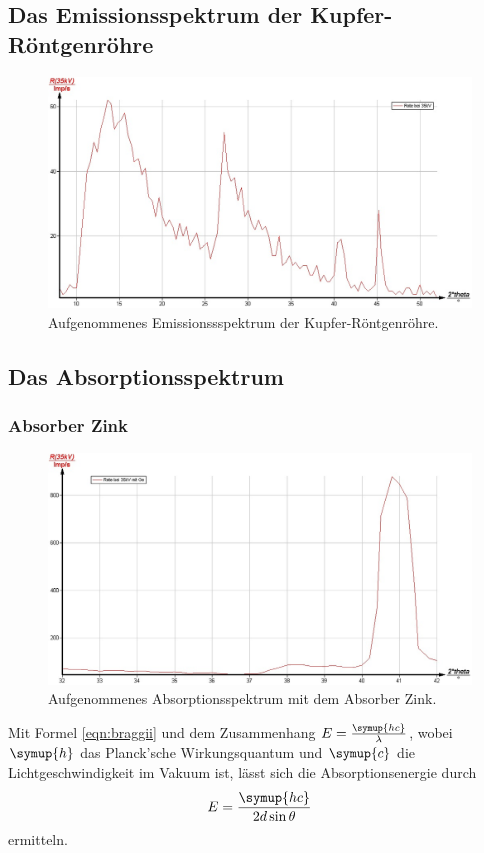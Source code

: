 \subsection{Das Emissionsspektrum der Kupfer-Röntgenröhre}

\begin{figure}
	\includegraphics[width=1.0\textwidth]{nIKO_und_jULIAN_ÜLADS/Kupfaemmision.jpg}
	\caption{Aufgenommenes Emissionssspektrum der Kupfer-Röntgenröhre.}
	\label{fig:emissionlol}
\end{figure}




\FloatBarrier
\subsection{Das Absorptionsspektrum}

\subsubsection{Absorber Zink}
\begin{figure}
	\includegraphics[width=1.0\textwidth]{nIKO_und_jULIAN_ÜLADS/zink.jpg}
	\caption{Aufgenommenes Absorptionsspektrum mit dem Absorber Zink.}
	\label{fig:zink_absorber}
\end{figure}
Mit Formel \eqref{eqn:braggii} und dem Zusammenhang $E = \frac{\symup{hc}}{\lambda}$,
wobei $\symup{h}$
das Planck'sche Wirkungsquantum und $\symup{c}$ die Lichtgeschwindigkeit im Vakuum ist, lässt
sich die Absorptionsenergie durch
\begin{equation}
	\label{eqn:Absorptionsenergie}
	E = \frac{\symup{hc}}{2d\sin\theta}
\end{equation}
ermitteln.

